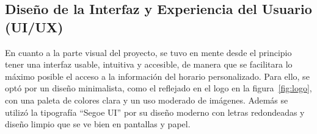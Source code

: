 \subsection{Diseño de la Interfaz y Experiencia del Usuario (UI/UX)}

En cuanto a la parte visual del proyecto, se tuvo en mente desde el principio tener una interfaz usable, intuitiva y accesible, de manera que se facilitara lo máximo posible el acceso a la información del horario personalizado.
\newline\newline
Para ello, se optó por un diseño minimalista, como el reflejado en el logo en la figura~\ref{fig:logo}, con una paleta de colores clara y un uso moderado de imágenes. Además se utilizó la tipografía ``Segoe UI'' por su diseño moderno con letras redondeadas y diseño limpio que se ve bien en pantallas y papel.
\newline
